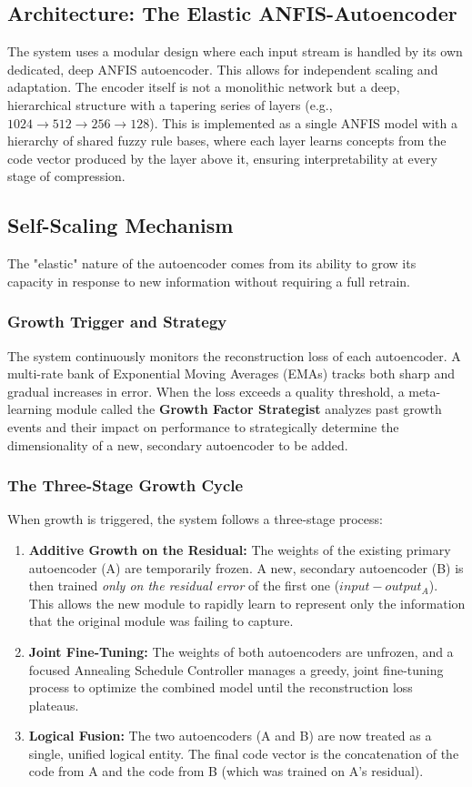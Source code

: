 \documentclass{article}
\begin{document}
\subsection{Architecture: The Elastic ANFIS-Autoencoder}
The system uses a modular design where each input stream is handled by its own dedicated, deep ANFIS autoencoder. This allows for independent scaling and adaptation. The encoder itself is not a monolithic network but a deep, hierarchical structure with a tapering series of layers (e.g., $1024 \to 512 \to 256 \to 128$). This is implemented as a single ANFIS model with a hierarchy of shared fuzzy rule bases, where each layer learns concepts from the code vector produced by the layer above it, ensuring interpretability at every stage of compression.

\subsection{Self-Scaling Mechanism}
The "elastic" nature of the autoencoder comes from its ability to grow its capacity in response to new information without requiring a full retrain.

\subsubsection{Growth Trigger and Strategy}
The system continuously monitors the reconstruction loss of each autoencoder. A multi-rate bank of Exponential Moving Averages (EMAs) tracks both sharp and gradual increases in error. When the loss exceeds a quality threshold, a meta-learning module called the \textbf{Growth Factor Strategist} analyzes past growth events and their impact on performance to strategically determine the dimensionality of a new, secondary autoencoder to be added.

\subsubsection{The Three-Stage Growth Cycle}
When growth is triggered, the system follows a three-stage process:
\begin{enumerate}
    \item \textbf{Additive Growth on the Residual:} The weights of the existing primary autoencoder (A) are temporarily frozen. A new, secondary autoencoder (B) is then trained \textit{only on the residual error} of the first one ($input - output_A$). This allows the new module to rapidly learn to represent only the information that the original module was failing to capture.
    \item \textbf{Joint Fine-Tuning:} The weights of both autoencoders are unfrozen, and a focused Annealing Schedule Controller manages a greedy, joint fine-tuning process to optimize the combined model until the reconstruction loss plateaus.
    \item \textbf{Logical Fusion:} The two autoencoders (A and B) are now treated as a single, unified logical entity. The final code vector is the concatenation of the code from A and the code from B (which was trained on A's residual).
\end{enumerate}
\end{document}
